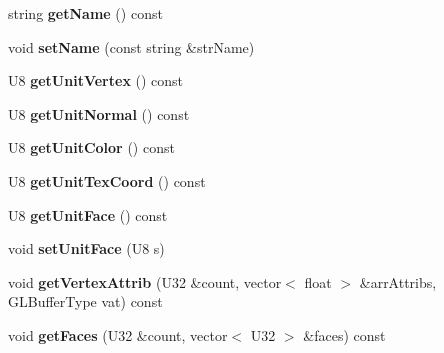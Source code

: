 \begin{DoxyCompactItemize}
\item 
\hypertarget{classps_1_1scene_1_1MeshNode_a7ece00736c911801762bc10fdca07f19}{}string {\bfseries get\+Name} () const \label{classps_1_1scene_1_1MeshNode_a7ece00736c911801762bc10fdca07f19}

\item 
\hypertarget{classps_1_1scene_1_1MeshNode_a58993714a990f817da49d5f8b96cd28c}{}void {\bfseries set\+Name} (const string \&str\+Name)\label{classps_1_1scene_1_1MeshNode_a58993714a990f817da49d5f8b96cd28c}

\item 
\hypertarget{classps_1_1scene_1_1MeshNode_ad2690cc20b520deef7ddb75e9e732bc1}{}U8 {\bfseries get\+Unit\+Vertex} () const \label{classps_1_1scene_1_1MeshNode_ad2690cc20b520deef7ddb75e9e732bc1}

\item 
\hypertarget{classps_1_1scene_1_1MeshNode_a314b19aa4f8f2f318e65d7a256d9b13f}{}U8 {\bfseries get\+Unit\+Normal} () const \label{classps_1_1scene_1_1MeshNode_a314b19aa4f8f2f318e65d7a256d9b13f}

\item 
\hypertarget{classps_1_1scene_1_1MeshNode_a2898527c4ed539aee68f7cd3823d65d9}{}U8 {\bfseries get\+Unit\+Color} () const \label{classps_1_1scene_1_1MeshNode_a2898527c4ed539aee68f7cd3823d65d9}

\item 
\hypertarget{classps_1_1scene_1_1MeshNode_a2558ab01df176a9253322c96d058b976}{}U8 {\bfseries get\+Unit\+Tex\+Coord} () const \label{classps_1_1scene_1_1MeshNode_a2558ab01df176a9253322c96d058b976}

\item 
\hypertarget{classps_1_1scene_1_1MeshNode_a849d8997220a3f375b04325b9f9cff7a}{}U8 {\bfseries get\+Unit\+Face} () const \label{classps_1_1scene_1_1MeshNode_a849d8997220a3f375b04325b9f9cff7a}

\item 
\hypertarget{classps_1_1scene_1_1MeshNode_ad00f6c2640f8f1858e685f1ce8fd01a8}{}void {\bfseries set\+Unit\+Face} (U8 s)\label{classps_1_1scene_1_1MeshNode_ad00f6c2640f8f1858e685f1ce8fd01a8}

\item 
\hypertarget{classps_1_1scene_1_1MeshNode_a00a0b531ce934e18afdb7f668b2e419f}{}void {\bfseries get\+Vertex\+Attrib} (U32 \&count, vector$<$ float $>$ \&arr\+Attribs, G\+L\+Buffer\+Type vat) const \label{classps_1_1scene_1_1MeshNode_a00a0b531ce934e18afdb7f668b2e419f}

\item 
\hypertarget{classps_1_1scene_1_1MeshNode_aa43d632903b7ebb08d6ca5520d98dcb1}{}void {\bfseries get\+Faces} (U32 \&count, vector$<$ U32 $>$ \&faces) const \label{classps_1_1scene_1_1MeshNode_aa43d632903b7ebb08d6ca5520d98dcb1}


\end{DoxyCompactItemize}
